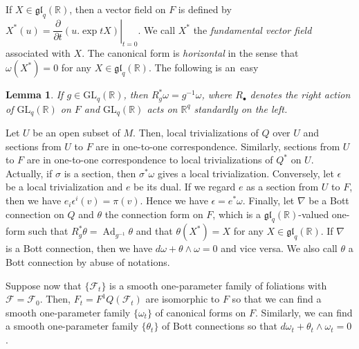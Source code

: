 \documentclass[12pt]{amsart}
\newcommand{\CF}{{\mathcal F}}
\newcommand{\R}{{\mathbb R}}
\newcommand{\gl}{\mathfrak{gl}}
\newcommand{\GL}{\mathrm{GL}}
\DeclareMathOperator{\Ad}{\mathrm{Ad}}
\newcommand{\pdif}[2]{\dfrac{\partial#1}{\partial#2}}
\newtheorem{lemma}[theorem]{Lemma}
\theoremstyle{definition}
\theoremstyle{remark}
\begin{document}
If $X\in\gl_q(\R)$, then a vector field on $F$ is defined by $X^*(u)=\left.\pdif{}{t}(u.\exp tX)\right|_{t=0}$.
We call $X^*$ the \textit{fundamental vector field} associated with $X$.
The canonical form is \textit{horizontal} in the sense that $\omega(X^*)=0$ for any $X\in\gl_q(\R)$.
The following is an~easy

\begin{lemma}
If $g\in\GL_q(\R)$, then $R_g^*\omega=g^{-1}\omega$, where $R_\bullet$ denotes the right action of\/ $\GL_q(\R)$ on $F$ and\/ $\GL_q(\R)$ acts on $\R^q$ standardly on the left.
\end{lemma}

Let $U$ be an open subset of $M$.
Then, local trivializations of $Q$ over $U$ and sections from $U$ to $F$ are in one-to-one correspondence.
Similarly, sections from $U$ to $F$ are in one-to-one correspondence to local trivializations of $Q^*$ on $U$.
Actually, if $\sigma$ is a section, then $\sigma^*\omega$ gives a local trivialization.
Conversely, let $\epsilon$ be a local trivialization and $e$ be its dual.
If we regard $e$ as a section from $U$ to $F$, then we have $e_i\epsilon^i(v)=\pi(v)$.
Hence we have $\epsilon=e^*\omega$.
Finally, let $\nabla$ be a Bott connection on $Q$ and $\theta$ the connection form on $F$, which is a $\gl_q(\R)$-valued one-form such that $R_g^*\theta=\Ad_{g^{-1}}\theta$ and that $\theta(X^*)=X$ for any $X\in\gl_q(\R)$.
If $\nabla$ is a Bott connection, then we have $d\omega+\theta\wedge\omega=0$ and vice versa.
We also call $\theta$ a Bott connection by abuse of notations.

Suppose now that $\{\CF_t\}$ is a smooth one-parameter family of foliations with $\CF=\CF_0$.
Then, $F_t=F^1Q(\CF_t)$ are isomorphic to $F$ so that we can find a smooth one-parameter family $\{\omega_t\}$ of canonical forms on $F$.
Similarly, we can find a smooth one-parameter family $\{\theta_t\}$ of Bott connections so that $d\omega_t+\theta_t\wedge\omega_t=0$.
\end{document}
